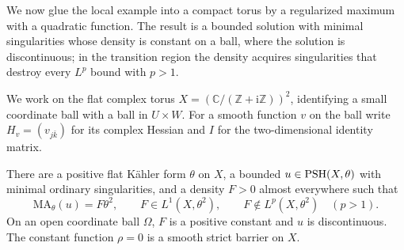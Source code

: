 We now glue the local example into a compact torus by a regularized maximum with a quadratic function. The result is a bounded solution with minimal singularities whose density is constant on a ball, where the solution is discontinuous; in the transition region the density acquires singularities that destroy every $L^p$ bound with $p>1$.

We work on the flat complex torus $X=(\mathbb C/(\mathbb Z+\mathrm{i}\mathbb Z))^2$, identifying a small coordinate ball with a ball in $U\times W$. For a smooth function $v$ on the ball write $H_v=(v_{j\bar k})$ for its complex Hessian and $I$ for the two-dimensional identity matrix.

\begin{theorem}\label{thm:compact-local-density-discontinuity}
There are a positive flat K\"ahler form $\theta$ on $X$, a bounded $u\in\mathrm{PSH}(X,\theta)$ with minimal ordinary singularities, and a density $F>0$ almost everywhere such that
\[
 \mathrm{MA}_\theta(u)=F\theta^2,\qquad
 F\in L^1(X,\theta^2),\qquad
 F\notin L^p(X,\theta^2)\quad(p>1).
\]
On an open coordinate ball $\Omega$, $F$ is a positive constant and $u$ is discontinuous. The constant function $\rho=0$ is a smooth strict barrier on $X$.
\end{theorem}

